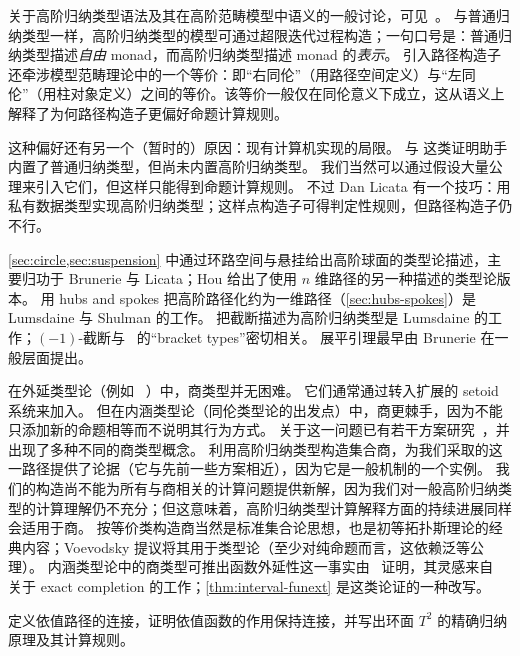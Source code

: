 关于高阶归纳类型语法及其在高阶范畴模型中语义的一般讨论，可见~\cite{ls:hits}。
与普通归纳类型一样，高阶归纳类型的模型可通过超限迭代过程构造；一句口号是：普通归纳类型描述\emph{自由} monad，而高阶归纳类型描述 monad 的\emph{表示}。
引入路径构造子还牵涉模型范畴理论中的一个等价：即“右同伦”（用路径空间定义）与“左同伦”（用柱对象定义）之间的等价。该等价一般仅在同伦意义下成立，这从语义上解释了为何路径构造子更偏好命题计算规则。

这种偏好还有另一个（暂时的）原因：现有计算机实现的局限。
\Coq 与 \Agda 这类证明助手内置了普通归纳类型，但尚未内置高阶归纳类型。
我们当然可以通过假设大量公理来引入它们，但这样只能得到命题计算规则。
不过 Dan Licata 有一个技巧：用私有数据类型实现高阶归纳类型；这样点构造子可得判定性规则，但路径构造子仍不行。

\cref{sec:circle,sec:suspension} 中通过环路空间与悬挂给出高阶球面的类型论描述，主要归功于 Brunerie 与 Licata；Hou 给出了使用 $n$ 维路径的另一种描述的类型论版本。
用 hubs and spokes 把高阶路径化约为一维路径（\cref{sec:hubs-spokes}）是 Lumsdaine 与 Shulman 的工作。
把截断描述为高阶归纳类型是 Lumsdaine 的工作；$(-1)$-截断与~\cite{ab:bracket-types} 的“bracket types”密切相关。
展平引理最早由 Brunerie 在一般层面提出。

在外延类型论（例如 \NuPRL~\cite{constable+86nuprl-book}）中，商类型并无困难。
它们通常通过转入扩展的 setoid 系统来加入。
但在内涵类型论（同伦类型论的出发点）中，商更棘手，因为不能只添加新的命题相等而不说明其行为方式。
关于这一问题已有若干方案研究~\cite{hofmann:thesis,Altenkirch1999,altenkirch+07ott}，并出现了多种不同的商类型概念。
利用高阶归纳类型构造集合商，为我们采取的这一路径提供了论据（它与先前一些方案相近），因为它是一般机制的一个实例。
我们的构造尚不能为所有与商相关的计算问题提供新解，因为我们对一般高阶归纳类型的计算理解仍不充分；但这意味着，高阶归纳类型计算解释方面的持续进展同样会适用于商。
按等价类构造商当然是标准集合论思想，也是初等拓扑斯理论的经典内容；Voevodsky 提议将其用于类型论（至少对纯命题而言，这依赖泛等公理）。
内涵类型论中的商类型可推出函数外延性这一事实由~\cite{hofmann:thesis} 证明，其灵感来自~\cite{carboni} 关于 exact completion 的工作；\cref{thm:interval-funext} 是这类论证的一种改写。

\sectionExercises

\begin{ex}\label{ex:torus}
  定义依值路径的连接，证明依值函数的作用保持连接，并写出环面 $T^2$ 的精确归纳原理及其计算规则。
\end{ex}

